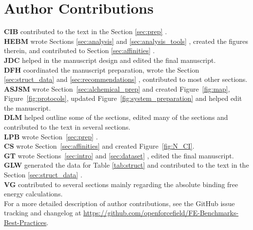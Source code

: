 \documentclass[9pt,bestpractices]{livecoms}
\newcommand{\githubrepository}{\url{https://github.com/openforcefield/FE-Benchmarks-Best-Practices}}  %
\begin{document}
\section{Author Contributions}
%
  \textbf{CIB} contributed to the text in the Section \ref{sec:prep} .\\
  \textbf{HEBM} wrote Sections \ref{sec:analysis}  and \ref{sec:analysis_tools} , created the figures therein, and contributed to Section \ref{sec:affinities} .\\
  \textbf{JDC} helped in the manuscript design and edited the final manuscript.\\
  \textbf{DFH} coordinated the manuscript preparation, wrote the Section \ref{sec:struct_data}   and \ref{sec:recommendations} , contributed to most other sections.\\
  \textbf{ASJSM} wrote Section~\ref{sec:alchemical_prep}  and created Figure~\ref{fig:map}, Figure~\ref{fig:protocols}, updated Figure~\ref{fig:system_preparation} and helped edit the manuscript. \\
  \textbf{DLM} helped outline some of the sections, edited many of the sections and contributed to the text in several sections. \\
  \textbf{LPB} wrote Section~\ref{sec:prep} .\\
  \textbf{CS} wrote Section~\ref{sec:affinities}  and created Figure~\ref{fig:N_CI}.\\
  \textbf{GT} wrote Sections~\ref{sec:intro}  and \ref{sec:dataset} , edited the final manuscript.\\
  \textbf{GLW} generated the data for Table \ref{tab:struct} and contributed to the text in the Section \ref{sec:struct_data}  .\\
  \textbf{VG} contributed to several sections mainly regarding the absolute binding free energy calculations.\\
For a more detailed description of author contributions,
see the GitHub issue tracking and changelog at \githubrepository.
\end{document}
